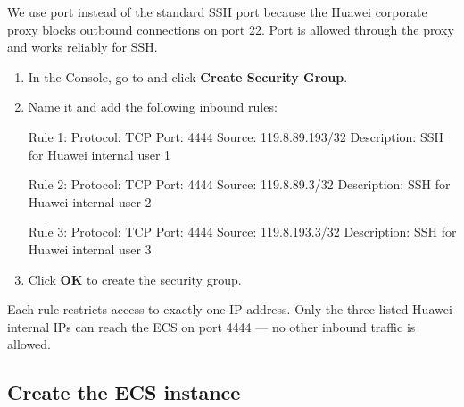 \documentclass{guide}
\begin{document}
\begin{infobox}
We use port  instead of the standard SSH port  because
the Huawei corporate proxy blocks outbound connections on port 22. Port
 is allowed through the proxy and works reliably for SSH.
\end{infobox}

\stepbystep
\begin{enumerate}
  \item In the Console, go to 
        and click \textbf{Create Security Group}.
  \item Name it  and add the following inbound rules:

  \begin{code}
Rule 1:
  Protocol:    TCP
  Port:        4444
  Source:      119.8.89.193/32
  Description: SSH for Huawei internal user 1

Rule 2:
  Protocol:    TCP
  Port:        4444
  Source:      119.8.89.3/32
  Description: SSH for Huawei internal user 2

Rule 3:
  Protocol:    TCP
  Port:        4444
  Source:      119.8.193.3/32
  Description: SSH for Huawei internal user 3
  \end{code}

  \item Click \textbf{OK} to create the security group.
\end{enumerate}

\begin{tip}
Each  rule restricts access to exactly one IP address. Only the
three listed Huawei internal IPs can reach the ECS on port 4444 --- no other
inbound traffic is allowed.
\end{tip}

\subsection{Create the ECS instance}

\end{document}
